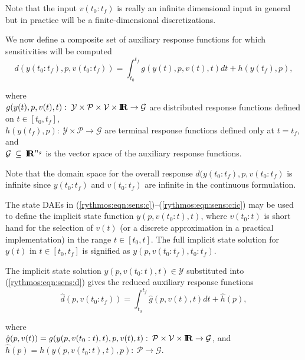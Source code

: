 \documentclass[pdf,ps2pdf,11pt]{SANDreport}
\begin{document}
Note that the input $v(t_0:t_f)$ is really an infinite dimensional
input in general but in practice will be a finite-dimensional
discretizations.

We now define a composite set of auxiliary response functions for which
sensitivities will be computed
%
\begin{equation}
d(y(t_0:t_f),p,v(t_0:t_f))
= \int_{t_0}^{t_f} g(y(t),p,v(t),t) dt + h(y(t_f),p),
\label{rythmos:eqn:sens:d}
\end{equation}
\begin{tabbing}
\hspace{4ex}where\hspace{1ex}\= \\
\>	$g(y(t),p,v(t),t) : \:
		\mathcal{Y} \times \mathcal{P} \times \mathcal{V} \times \mbox{\textbf{I}}\hspace{-0.6ex}\mbox{\textbf{R}}
		\rightarrow \mathcal{G}$ are distributed response functions defined on $t\in[t_0,t_f]$, \\
\>	$h(y(t_f),p) : \: \mathcal{Y} \times \mathcal{P}
		\rightarrow \mathcal{G}$ are terminal response functions defined only at $t=t_f$, and \\
\>	$\mathcal{G} \:\subseteq\:\mbox{\textbf{I}}\hspace{-0.6ex}\mbox{\textbf{R}}^{n_g}$ is the vector space of the auxiliary response functions.
\end{tabbing}

Note that the domain space for the overall response
$d(y(t_0:t_f),p,v(t_0:t_f)$ is infinite since $y(t_0:t_f)$ and
$v(t_0:t_f)$ are infinite in the continuous formulation.

The state DAEs in
(\ref{rythmos:eqn:sens:c})--(\ref{rythmos:eqn:sens:c:ic}) may be used
to define the implicit state function $y(p,v(t_0:t),t)$, where
$v(t_0:t)$ is short hand for the selection of $v(t)$ (or a discrete
approximation in a practical implementation) in the range
$t\in[t_0,t]$.  The full implicit state solution for $y(t)$ in
$t\in[t_0,t_f]$ is signified as $y(p,v(t_0:t_f),t_0:t_f)$.

The implicit state solution $y(p,v(t_0:t),t)\in\mathcal{Y}$ substituted into
(\ref{rythmos:eqn:sens:d}) gives the reduced auxiliary response functions
%
\begin{equation}
\hat{d}(p,v(t_0:t_f))
= \int_{t_0}^{t_f} \hat{g}(p,v(t),t) dt + \hat{h}(p),
\label{rythmos:eqn:sens:d_hat}
\end{equation}
\begin{tabbing}
\hspace{4ex}where\hspace{1ex}\= \\
\>	$\hat{g}(p,v(t)) = g(y(p,v(t_0:t),t),p,v(t),t) : \:
		\mathcal{P} \times \mathcal{V} \times \mbox{\textbf{I}}\hspace{-0.6ex}\mbox{\textbf{R}}	\rightarrow \mathcal{G}$, and \\
\>	$\hat{h}(p) = h(y(p,v(t_0:t),t),p) : \: \mathcal{P}	\rightarrow \mathcal{G}$.
\end{tabbing}
\end{document}
